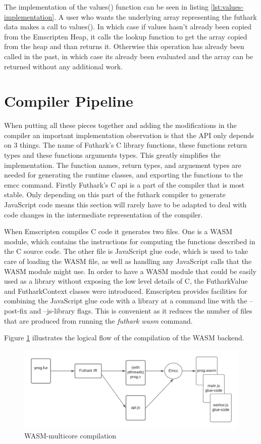 \documentclass[11pt]{book}
\begin{document}
The implementation of the values() function can be seen in listing \ref{lst:values-implementation}. A user who wants the underlying array representing the futhark data makes a call to values(). In which case if values hasn't already been copied from the Emscripten Heap, it calls the lookup function to get the array copied from the heap and than returns it. Otherwise this operation has already been called in the past, in which case its already been evaluated and the array can be returned without any additional work. 

\section{Compiler Pipeline}

When putting all these pieces together and adding the modifications in the compiler an important implementation observation is that the API only depends on 3 things. The name of Futhark's C library functions, these functions return types and these functions arguments types. This greatly simplifies the implementation. The function names, return types, and arguement types are needed for generating the runtime classes, and exporting the functions to the emcc command. Firstly Futhark's C api is a part of the compiler that is most stable. Only depending on this part of the futhark compiler to generate JavaScript code means this section will rarely have to be adapted to deal with code changes in the intermediate representation of the compiler.

When Emscripten compiles C code it generates two files. One is a WASM module, which contains the instructions for computing the functions described in the C source code. The other file is JavaScript glue code, which is used to take care of loading the WASM file, as well as handling any JavaScript calls that the WASM module might use. In order to have a WASM module that could be easily used as a library without exposing the low level details of C, the FutharkValue and FutharkContext classes were introduced. Emscripten provides facilities for combining the JavaScript glue code with a library at a command line with the --post-fix and --js-library flags. This is convenient as it reduces the number of files that are produced from running the \textit{futhark wasm} command.



Figure \ref{fig:wasm} illustrates the logical flow of the compilation of the WASM backend. 

\begin{figure}[htbp]
\centerline{\includegraphics[width=\textwidth]{figures/WASM_MC_compiler.png}}
\caption{WASM-multicore compilation}
\label{fig:wasm}
\end{figure}
\end{document}
